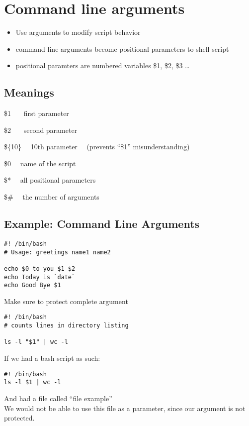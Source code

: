 \documentclass{report}
\begin{document}
\section{Command line arguments}
\begin{itemize}
  \item Use arguments to modify script behavior 
  \item command line arguments become positional parameters to shell script
  \item positional paramters are numbered variables
    \subitem \$1, \$2, \$3 \ldots
\end{itemize}
\subsection{Meanings}
\$1 \ \ \ first parameter \vspace{2mm}

\noindent \$2 \ \ \ second parameter \vspace{2mm}

\noindent     \$\{10\}  \ \ 10th parameter \ \ (prevents ``\$1'' misunderstanding) \vspace{2mm}

\noindent \$0  \ \ name of the script \vspace{2mm}

\noindent \$*  \ \ all positional parameters \vspace{2mm}

\noindent \$\#  \ \ the number of arguments
\subsection{Example: Command Line Arguments}
\begin{mdframed}
  \begin{verbatim}
#! /bin/bash
# Usage: greetings name1 name2

echo $0 to you $1 $2
echo Today is `date`
echo Good Bye $1
\end{verbatim}
\end{mdframed}
Make sure to protect complete argument 
\begin{verbatim}
#! /bin/bash
# counts lines in directory listing

ls -l "$1" | wc -l
\end{verbatim}
If we had a bash script as such:
\begin{verbatim}
#! /bin/bash
ls -l $1 | wc -l
\end{verbatim}
And had a file called ``file example'' \\
We would not be able to use this file as a parameter, since our argument is not protected.
\end{document}
